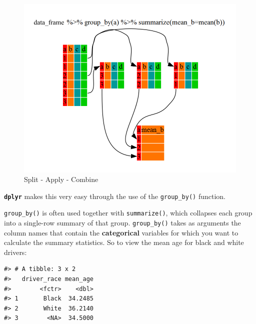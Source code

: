 \documentclass[]{book}
\newenvironment{Shaded}{\begin{snugshade}}{\end{snugshade}}
\newcommand{\KeywordTok}[1]{\textcolor[rgb]{0.13,0.29,0.53}{\textbf{#1}}}
\newcommand{\DataTypeTok}[1]{\textcolor[rgb]{0.13,0.29,0.53}{#1}}
\newcommand{\StringTok}[1]{\textcolor[rgb]{0.31,0.60,0.02}{#1}}
\newcommand{\OtherTok}[1]{\textcolor[rgb]{0.56,0.35,0.01}{#1}}
\newcommand{\OperatorTok}[1]{\textcolor[rgb]{0.81,0.36,0.00}{\textbf{#1}}}
\newcommand{\NormalTok}[1]{#1}
\theoremstyle{definition}
\theoremstyle{definition}
\theoremstyle{definition}
\theoremstyle{remark}
\begin{document}
\begin{figure}
\includegraphics[width=\textwidth]{img/split-apply-combine} \caption{Split - Apply - Combine}\label{fig:split-apply-combine}
\end{figure}

\textbf{\texttt{dplyr}} makes this very easy through the use of the
\texttt{group\_by()} function.

\texttt{group\_by()} is often used together with \texttt{summarize()},
which collapses each group into a single-row summary of that group.
\texttt{group\_by()} takes as arguments the column names that contain
the \textbf{categorical} variables for which you want to calculate the
summary statistics. So to view the mean age for black and white drivers:

\begin{Shaded}
\end{Shaded}

\begin{verbatim}
#> # A tibble: 3 x 2
#>   driver_race mean_age
#>        <fctr>    <dbl>
#> 1       Black  34.2485
#> 2       White  36.2140
#> 3        <NA>  34.5000
\end{verbatim}
\end{document}
